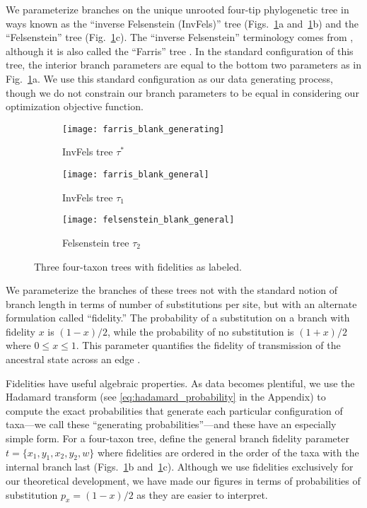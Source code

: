 \documentclass[11pt]{article}
\begin{document}
We parameterize branches on the unique unrooted four-tip phylogenetic tree in ways known as the ``inverse Felsenstein (InvFels)'' tree (Figs.~\ref{fig:farris-fels-top}a and~\ref{fig:farris-fels-top}b) and the ``Felsenstein'' tree (Fig.~\ref{fig:farris-fels-top}c).
The ``inverse Felsenstein'' terminology comes from \citet{Swofford2001-hr}, although it is also called the ``Farris'' tree \citep{Siddall1998-hq, Felsenstein2004}.
In the standard configuration of this tree, the interior branch parameters are equal to the bottom two parameters as in Fig.~\ref{fig:farris-fels-top}a.
We use this standard configuration as our data generating process, though we do not constrain our branch parameters to be equal in considering our optimization objective function.

\begin{figure}
\centering
\begin{subfigure}{.32\linewidth}
\centering
\texttt{[image: farris\_blank\_generating]}
\caption[short]{InvFels tree $\tau^*$}
\end{subfigure}
\begin{subfigure}{.32\linewidth}
\centering
\texttt{[image: farris\_blank\_general]}
\caption[short]{InvFels tree $\tau_1$}
\end{subfigure}
\begin{subfigure}{.32\linewidth}
\centering
\texttt{[image: felsenstein\_blank\_general]}
\caption[short]{Felsenstein tree $\tau_2$}
\end{subfigure}
\caption{Three four-taxon trees with fidelities as labeled.}
\label{fig:farris-fels-top}
\end{figure}

We parameterize the branches of these trees not with the standard notion of branch length in terms of number of substitutions per site, but with an alternate formulation called ``fidelity.''
The probability of a substitution on a branch with fidelity $x$ is $(1-x)/2$, while the probability of no substitution is $(1+x)/2$ where $0 \le x \le 1$.
This parameter quantifies the fidelity of transmission of the ancestral state across an edge \citep{Matsen2007-jq}.

Fidelities have useful algebraic properties.
As data becomes plentiful, we use the Hadamard transform (see \eqref{eq:hadamard_probability} in the Appendix) to compute the exact probabilities that generate each particular configuration of taxa---we call these ``generating probabilities''---and these have an especially simple form.
For a four-taxon tree, define the general branch fidelity parameter $t=\{x_1,y_1,x_2,y_2,w\}$ where fidelities are ordered in the order of the taxa with the internal branch last (Figs.~\ref{fig:farris-fels-top}b and~\ref{fig:farris-fels-top}c).
Although we use fidelities exclusively for our theoretical development, we have made our figures in terms of probabilities of substitution $p_{x} = (1-x)/2$ as they are easier to interpret.
\end{document}
